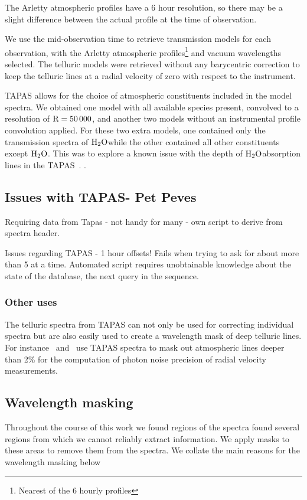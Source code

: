 The Arletty atmospheric profiles have a 6 hour resolution, so there may be a slight difference between the actual profile at the time of observation.

We use the mid-observation time to retrieve transmission models for each observation, with the Arletty atmospheric profiles\footnote{Nearest of the 6 hourly profiles} and vacuum wavelengths selected. The telluric models were retrieved without any barycentric correction to keep the telluric lines at a radial velocity of zero with respect to the instrument.

TAPAS allows for the choice of atmospheric constituents included in the model spectra. We obtained one model with all available species present, convolved to a resolution of \(\rm R=50\,000\), and another two models without an instrumental profile convolution applied. For these two extra models, one contained only the transmission spectra of \(\rm H_{2}O\)while the other contained all other constituents except \(\rm H_{2}O\). This was to explore a known issue with the depth of \(\rm H_{2}O\)absorption lines in the TAPAS~\citet{bertaux_tapas_2014}. .


\subsection{Issues with TAPAS-  Pet Peves}
Requiring data from Tapas
- not handy for many
- own script to derive from spectra header.

Issues regarding TAPAS - 1 hour offsets!
Fails when trying to ask for about more than 5 at a time.
Automated script requires unobtainable knowledge about the state of the database, the next query in the sequence.



\subsubsection{Other uses}
The telluric spectra from TAPAS can not only be used for correcting individual spectra but are also easily used to create a wavelength mask of deep telluric lines. For instance~\citet{figueira_radial_2016} and~\citet{artigau_optical_2018} use TAPAS spectra to mask out atmospheric lines deeper than 2\% for the computation of photon noise precision of radial velocity measurements.


\subsection{Wavelength masking}
Throughout the course of this work we found regions of the spectra found several regions from which we cannot reliably extract information.
We apply masks to these areas to remove them from the spectra. We collate the main reasons for the wavelength masking below

